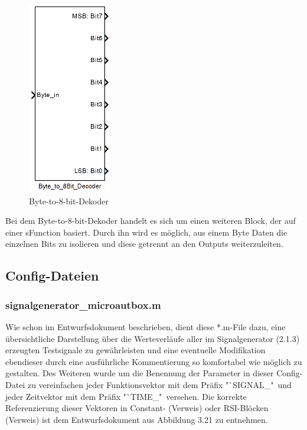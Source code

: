 \documentclass[fontsize = 12pt, paper = a4]{scrreprt}
\begin{document}
\begin{itemize}
\begin{figure}[h]
\centering
\includegraphics[scale = 0.8]{byteto8bit}
\caption[Byte-to-8-bit-Dekoder]{Byte-to-8-bit-Dekoder}
\label{Byte-to-8-bit-Dekoder}
\end{figure}

Bei dem Byte-to-8-bit-Dekoder handelt es sich um einen weiteren Block, der auf einer sFunction basiert. Durch ihn wird es möglich, aus einem Byte Daten die einzelnen Bits zu isolieren und diese getrennt an den Outputs weiterzuleiten.

\end{itemize}




\subsection{Config-Dateien}

\subsubsection{signalgenerator\_microautbox.m}

Wie schon im Entwurfsdokument beschrieben, dient diese *.m-File dazu, eine übersichtliche Darstellung über die Werteverläufe aller im Signalgenerator (2.1.3) erzeugten Testsignale zu gewährleisten und eine eventuelle Modifikation ebendieser durch eine ausführliche Kommentierung so komfortabel wie möglich zu gestalten. Des Weiteren wurde um die Benennung der Parameter in dieser Config-Datei zu vereinfachen jeder Funktionsvektor mit dem Präfix "`SIGNAL\_"\ und jeder Zeitvektor mit dem Präfix "`TIME\_"\ versehen. Die korrekte Referenzierung dieser Vektoren in Constant- (Verweis) oder RSI-Blöcken (Verweis) ist dem Entwurfsdokument aus Abbildung 3.21 zu entnehmen.  
\end{document}
